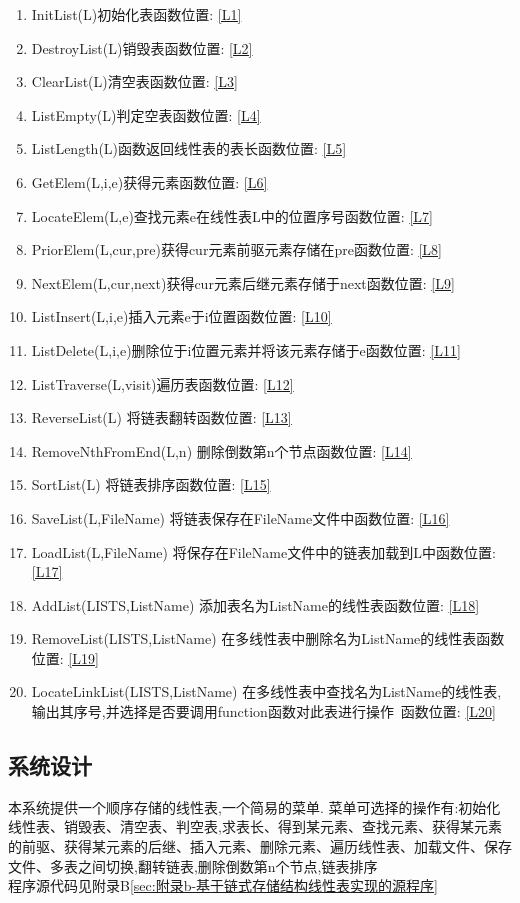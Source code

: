 \documentclass[supercite]{HustGraduPaper}
\theoremstyle{definition}
\begin{document}
\begin{enumerate}[label =\color{red} (\arabic*)]
	\item InitList(L)初始化表\quad 函数位置: \ref{L1}
	\item DestroyList(L)销毁表\quad 函数位置: \ref{L2}
	\item ClearList(L)清空表\quad 函数位置: \ref{L3}
	\item ListEmpty(L)判定空表\quad 函数位置: \ref{L4}
	\item ListLength(L)函数返回线性表的表长\quad 函数位置: \ref{L5}
	\item GetElem(L,i,e)获得元素\quad 函数位置: \ref{L6}
	\item LocateElem(L,e)查找元素e在线性表L中的位置序号\quad 函数位置: \ref{L7}
	\item PriorElem(L,cur,pre)获得cur元素前驱元素存储在pre\quad 函数位置: \ref{L8}
	\item NextElem(L,cur,next)获得cur元素后继元素存储于next\quad 函数位置: \ref{L9}
	\item ListInsert(L,i,e)插入元素e于i位置\quad 函数位置: \ref{L10}
	\item ListDelete(L,i,e)删除位于i位置元素并将该元素存储于e\quad 函数位置: \ref{L11}
	\item ListTraverse(L,visit)遍历表\quad 函数位置: \ref{L12}
	\item ReverseList(L) 将链表翻转\quad 函数位置: \ref{L13}
	\item RemoveNthFromEnd(L,n) 删除倒数第n个节点\quad 函数位置: \ref{L14}
	\item SortList(L) 将链表排序\quad 函数位置: \ref{L15}
	\item SaveList(L,FileName) 将链表保存在FileName文件中\quad 函数位置: \ref{L16}
	\item LoadList(L,FileName) 将保存在FileName文件中的链表加载到L中\quad 函数位置: \ref{L17}
	\item AddList(LISTS,ListName) 添加表名为ListName的线性表\quad 函数位置: \ref{L18}
	\item RemoveList(LISTS,ListName) 在多线性表中删除名为ListName的线性表\quad 函数位置: \ref{L19}
	\item LocateLinkList(LISTS,ListName) 在多线性表中查找名为ListName的线性表,输出其序号,并选择是否要调用function函数对此表进行操作\, 函数位置: \ref{L20}
\end{enumerate}
\subsection{系统设计}
本系统提供一个顺序存储的线性表,一个简易的菜单.
菜单可选择的操作有:初始化线性表、销毁表、清空表、判空表,求表长、得到某元素、查找元素、获得某元素的前驱、获得某元素的后继、插入元素、删除元素、遍历线性表、加载文件、保存文件、多表之间切换,翻转链表,删除倒数第n个节点,链表排序\\
程序源代码见附录B\ref{sec:附录b-基于链式存储结构线性表实现的源程序}
\end{document}
